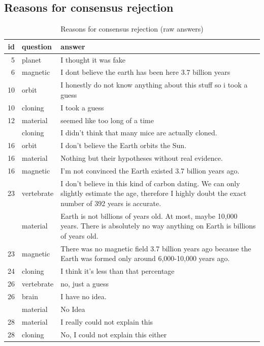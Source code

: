 \documentclass[
  doc,floatsintext]{apa6}
\begin{document}
\subsection{Reasons for consensus rejection}\label{reasons-for-consensus-rejection-2}

\begin{longtable}[t]{>{}r>{}l>{\raggedright\arraybackslash}p{30em}}
\caption{\label{tab:exp4-reasons-rejection}Reasons for consensus rejection (raw answers)}\\
\toprule
id & question & answer\\
\midrule
5 & planet & I thought it was fake\\
6 & magnetic & I dont believe the earth has been here 3.7 billion years\\
10 & orbit & I honestly do not know anything about this stuff so i took a guess\\
10 & cloning & I took a guess\\
12 & material & seemed like too long of a time\\
\addlinespace
14 & cloning & I didn't think that many mice are actually cloned.\\
16 & orbit & I don't believe the Earth orbits the Sun.\\
16 & material & Nothing but their hypotheses without real evidence.\\
16 & magnetic & I'm not convinced the Earth existed 3.7 billion years ago.\\
23 & vertebrate & I don't believe in this kind of carbon dating. We can only slightly estimate the age, therefore I highly doubt the exact number of 392 years is accurate.\\
\addlinespace
23 & material & Earth is not billions of years old. At most, maybe 10,000 years. There is absolutely no way anything on Earth is billions of years old.\\
23 & magnetic & There was no magnetic field 3.7 billion years ago because the Earth was formed only around 6,000-10,000 years ago.\\
24 & cloning & I think it's less than that percentage\\
26 & vertebrate & no, just a guess\\
26 & brain & I have no idea.\\
\addlinespace
26 & material & No Idea\\
28 & material & I really could not explain this\\
28 & cloning & No, I could not explain this either\\

\end{longtable}
\end{document}
